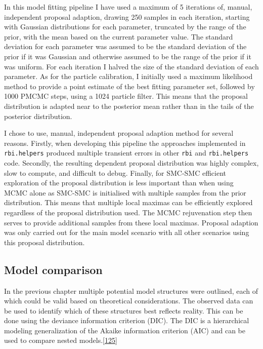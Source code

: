 \documentclass[11pt,twoside]{bristolthesis}
\begin{document}
  In this model fitting pipeline I have used a maximum of 5 iterations of, manual, independent proposal adaption, drawing 250 samples in each iteration, starting with Gaussian distributions for each parameter, truncated by the range of the prior, with the mean based on the current parameter value. The standard deviation for each parameter was assumed to be the standard deviation of the prior if it was Gaussian and otherwise assumed to be the range of the prior if it was uniform. For each iteration I halved the size of the standard deviation of each parameter. As for the particle calibration, I initially used a maximum likelihood method to provide a point estimate of the best fitting parameter set, followed by 1000 PMCMC steps, using a 1024 particle filter. This means that the proposal distribution is adapted near to the posterior mean rather than in the tails of the posterior distribution.
  
  I chose to use, manual, independent proposal adaption method for several reasons. Firstly, when developing this pipeline the approaches implemented in \texttt{rbi.helpers} produced multiple transient errors in other \texttt{rbi} and \texttt{rbi.helpers} code. Secondly, the resulting dependent proposal distribution was highly complex, slow to compute, and difficult to debug. Finally, for SMC-SMC efficient exploration of the proposal distribution is less important than when using MCMC alone as SMC-SMC is initialised with multiple samples from the prior distribution. This means that multiple local maximas can be efficiently explored regardless of the proposal distribution used. The MCMC rejuvenation step then serves to provide additional samples from these local maximas. Proposal adaption was only carried out for the main model scenario with all other scenarios using this proposal distribution.
  
  \hypertarget{model-comparison}{%
  \subsection{Model comparison}\label{model-comparison}}
  
  In the previous chapter multiple potential model structures were outlined, each of which could be valid based on theoretical considerations. The observed data can be used to identify which of these structures best reflects reality. This can be done using the deviance information criterion (DIC). The DIC is a hierarchical modeling generalization of the Akaike information criterion (AIC) and can be used to compare nested models.{[}\protect\hyperlink{ref-Gelman:nll_LBlw}{125}{]}
  
\end{document}
